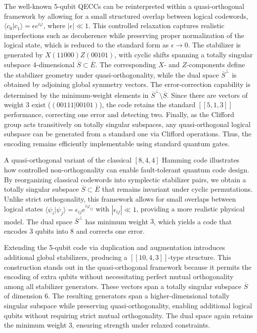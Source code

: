 \documentclass{iopjournal}
\theoremstyle{thmstyleone}%
\theoremstyle{thmstyletwo}%
\theoremstyle{thmstylethree}%
\begin{document}
The well-known 5-qubit QECCs \cite{Calderbank1997quantum,Laflamme1996perfect} can be reinterpreted within a quasi-orthogonal framework by allowing for a small structured overlap between logical codewords, $\langle c_0 | c_1 \rangle = \epsilon e^{i\varphi}$, where $|\epsilon| \ll 1$. This controlled relaxation captures realistic imperfections such as decoherence while preserving proper normalization of the logical state, which is reduced to the standard form as $\epsilon \to 0$. The stabilizer is generated by $X(11000)Z(00101)$, with cyclic shifts spanning a totally singular subspace $4$-dimensional $\overline{S} \subset \overline{E}$. The corresponding $X$- and $Z$-components define the stabilizer geometry under quasi-orthogonality, while the dual space $\overline{S}^{\perp}$ is obtained by adjoining global symmetry vectors. The error-correction capability is determined by the minimum-weight elements in $\overline{S}^{\perp} \setminus \overline{S}$. Since there are vectors of weight $3$ exist ($(00111|00101)$), the code retains the standard $[[5,1,3]]$ performance, correcting one error and detecting two. Finally, as the Clifford group acts transitively on totally singular subspaces, any quasi-orthogonal logical subspace can be generated from a standard one via Clifford operations. Thus, the encoding remains efficiently implementable using standard quantum gates.

\medskip

A quasi-orthogonal variant of the classical $[8,4,4]$ Hamming code illustrates how controlled non-orthogonality can enable fault-tolerant quantum code design. By reorganizing classical codewords into symplectic stabilizer pairs, we obtain a totally singular subspace $\overline{S} \subset \overline{E}$ that remains invariant under cyclic permutations. Unlike strict orthogonality, this framework allows for small overlaps between logical states $\langle \psi_i | \psi_j \rangle = \epsilon_{ij} e^{i\varphi_{ij}}$ with $|\epsilon_{ij}| \ll 1$, providing a more realistic physical model. The dual space $\overline{S}^\perp$ has minimum weight $3$, which yields a code that encodes $3$ qubits into $8$ and corrects one error.

Extending the 5-qubit code via duplication and augmentation introduces additional global stabilizers, producing a $[[10,4,3]]$-type structure. This construction stands out in the quasi-orthogonal framework because it permits the encoding of extra qubits without necessitating perfect mutual orthogonality among all stabilizer generators. 
 These vectors span a totally singular subspace $\overline{S}$ of dimension 6. The resulting generators span a higher-dimensional totally singular subspace while preserving quasi-orthogonality, enabling additional logical qubits without requiring strict mutual orthogonality. The dual space again retains the minimum weight $3$, ensuring strength under relaxed constraints. 
\end{document}
